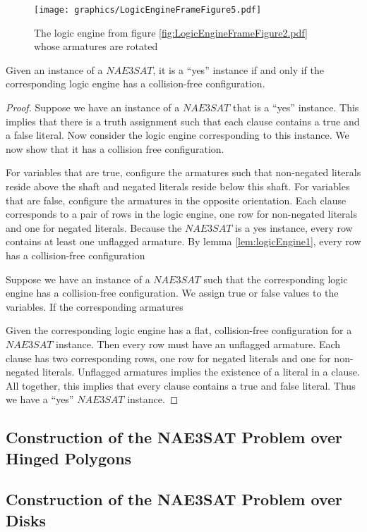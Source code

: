 \begin{figure}[!htbp]
\begin{center}
\texttt{[image: graphics/LogicEngineFrameFigure5.pdf]}
\caption{The logic engine from figure \ref{fig:LogicEngineFrameFigure2.pdf} whose armatures are rotated}\label{fig:LogicEngineFrameFigure5.pdf}
\end{center}
\end{figure}
\begin{thm}\label{thm:Satisfiability-1}
 Given an instance of a $NAE3SAT$,  it is a ``yes'' instance if and only if the 
corresponding logic engine has a collision-free configuration.
\end{thm}
\begin{proof}
Suppose we have an instance of a $NAE3SAT$ that is a ``yes'' instance. This implies that there is a 
truth assignment such that each clause contains a true and a false literal. Now consider the logic 
engine corresponding to this instance. We now 
show that it has a collision free configuration.

For variables that are true, configure the armatures such that non-negated literals reside above the 
shaft and negated literals reside below this shaft.  For variables that are false, configure the 
armatures in the opposite orientation.  Each clause corresponds to a pair of rows in 
the logic engine, one row for non-negated literals and one for negated literals.  Because the 
$NAE3SAT$ is a yes instance, every row contains at least one unflagged armature.  
By lemma \ref{lem:logicEngine1}, every row  has a collision-free configuration

Suppose we have an instance of a $NAE3SAT$ such that the corresponding logic engine has a 
collision-free configuration.  We assign true or false values to the variables.  If the 
corresponding armatures 

Given the corresponding logic engine has a flat, collision-free configuration for a $NAE3SAT$ 
instance.  Then every row must have an unflagged armature.  Each clause has two corresponding rows, 
one row for negated literals and one for non-negated literals.  Unflagged armatures implies the 
existence of a literal in a clause. All together, this implies that every clause contains a true and 
false literal.  Thus we have a ``yes'' $NAE3SAT$ instance.
\end{proof}

\subsection{Construction of the NAE3SAT Problem over Hinged Polygons}

\subsection{Construction of the NAE3SAT Problem over Disks}
